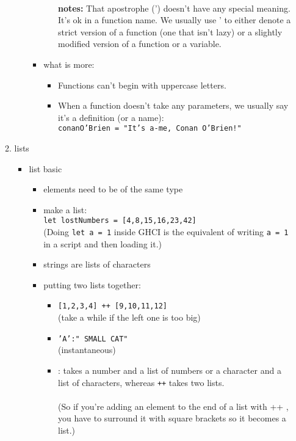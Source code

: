 \documentclass[a4paper,10pt]{article}
\begin{document}
\begin{enumerate}
\begin{enumerate}
\begin{itemize}
\begin{itemize}
\begin{itemize}
    \\\textbf{notes:} That apostrophe (') doesn't have any special meaning. It's ok in a function name. We usually use ' to either denote a strict version of a function (one that isn't lazy) or a slightly modified version of a function or a
variable.\\
   \end{itemize}
   \item what is more:
   \begin{itemize}
    \item Functions can't begin with uppercase letters.
    \item When a function doesn't take any parameters, we usually say it's a definition (or a name):
    \\\texttt{conanO'Brien = "It's a-me, Conan O'Brien!"}
   \end{itemize}
  \end{itemize}
  \end{itemize}
  \item lists
  \begin{itemize}
   \item list basic
  \begin{itemize}
   \item elements need to be of the same type
   \item make a list:
   \\\texttt{let lostNumbers = [4,8,15,16,23,42]}
   \\(Doing \texttt{let a = 1} inside GHCI is the equivalent of writing \texttt{a = 1} in a script and then loading it.)
   \item  strings are lists of characters
   \item putting two lists together:
   \begin{itemize}
    \item \texttt{[1,2,3,4] ++ [9,10,11,12]}
    \\(take a while if the left one is too big)
    \\\item \texttt{'A':" SMALL CAT"}
    \\(instantaneous)
    \\\item \texttt{}{:} takes a number and a list of numbers or a character and a list of characters, whereas \texttt{++} takes two lists. 
    \\\\(So if you're adding an element to the end of a list with ++ , you have to surround it with square brackets so it becomes a list.)

\end{itemize}
\end{itemize}
\end{itemize}
\end{enumerate}
\end{enumerate}
\end{document}
